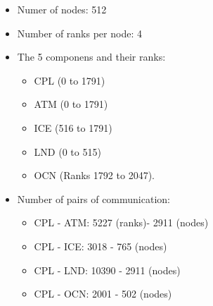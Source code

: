 \begin{itemize}

\item Numer of nodes: 512

\item Number of ranks per node: 4

\item The 5 componens and their ranks:

\begin{itemize}

\item CPL (0 to 1791)
\item ATM (0 to 1791)
\item ICE (516 to 1791)
\item LND (0 to 515)
\item OCN (Ranks 1792 to 2047).
\end{itemize}

\item Number of pairs of communication:

\begin{itemize}
\item CPL - ATM: 5227 (ranks)- 2911 (nodes)
\item CPL - ICE: 3018 - 765 (nodes)
\item CPL - LND: 10390 - 2911 (nodes)
\item CPL - OCN: 2001 - 502 (nodes)
\end{itemize}

\end{itemize}
